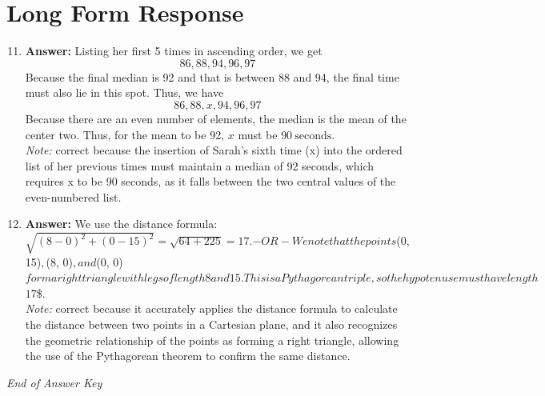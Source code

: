 \documentclass[12pt]{article}
\begin{document}
\section*{Long Form Response}
\begin{enumerate}[label=\arabic*.]
\setcounter{enumi}{10}
\item \textbf{Answer:} Listing her first 5 times in ascending order, we get \[86,88,94,96,97\] Because the final median is 92 and that is between 88 and 94, the final time must also lie in this spot. Thus, we have \[86,88,x,94,96,97\] Because there are an even number of elements, the median is the mean of the center two. Thus, for the mean to be 92, $x$ must be $\boxed{90}~\text{seconds}$.
\\ \textit{Note:} correct because the insertion of Sarah's sixth time (x) into the ordered list of her previous times must maintain a median of 92 seconds, which requires x to be 90 seconds, as it falls between the two central values of the even-numbered list.
\item \textbf{Answer:} We use the distance formula: $\sqrt{(8 - 0)^2 + (0 - 15)^2} = \sqrt{64 + 225} = \boxed {17}.$$- OR - We note that the points $(0, 15)$, $(8, 0)$, and $(0, 0)$ form a right triangle with legs of length 8 and 15. This is a Pythagorean triple, so the hypotenuse must have length $\ensuremath{\boxed{17}}\$.
\\ \textit{Note:} correct because it accurately applies the distance formula to calculate the distance between two points in a Cartesian plane, and it also recognizes the geometric relationship of the points as forming a right triangle, allowing the use of the Pythagorean theorem to confirm the same distance.
\end{enumerate}

\vfill
\noindent\textit{End of Answer Key}
\end{document}
